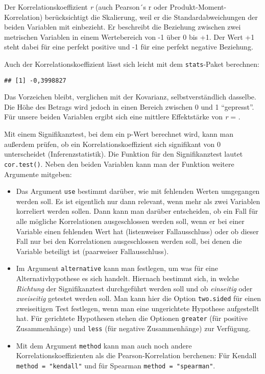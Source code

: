 \documentclass[
]{book}
\newenvironment{Shaded}{\begin{snugshade}}{\end{snugshade}}
\newcommand{\FunctionTok}[1]{\textcolor[rgb]{0.00,0.00,0.00}{#1}}
\newcommand{\NormalTok}[1]{#1}
\newcommand{\SpecialCharTok}[1]{\textcolor[rgb]{0.00,0.00,0.00}{#1}}
\begin{document}
Der Korrelationskoeffizient \emph{r} (auch Pearson´s r oder Produkt-Moment-Korrelation) berücksichtigt die Skalierung, weil er die Standardabweichungen der beiden Variablen mit einbezieht. Er beschreibt die Beziehung zwischen zwei metrischen Variablen in einem Wertebereich von -1 über 0 bis +1. Der Wert +1 steht dabei für eine perfekt positive und -1 für eine perfekt negative Beziehung.

Auch der Korrelationskoeffizient lässt sich leicht mit dem \texttt{stats}-Paket berechnen:

\begin{Shaded}
\end{Shaded}

\begin{verbatim}
## [1] -0,3998827
\end{verbatim}

Das Vorzeichen bleibt, verglichen mit der Kovarianz, selbstverständlich dasselbe. Die Höhe des Betrags wird jedoch in einen Bereich zwischen 0 und 1 ``gepresst''. Für unsere beiden Variablen ergibt sich eine mittlere Effektstärke von \emph{r} = .

Mit einem Signifikanztest, bei dem ein p-Wert berechnet wird, kann man außerdem prüfen, ob ein Korrelationskoeffizient sich signifikant von 0 unterscheidet (Inferenzstatistik). Die Funktion für den Signifikanztest lautet \texttt{cor.test()}. Neben den beiden Variablen kann man der Funktion weitere Argumente mitgeben:

\begin{itemize}
\item
  Das Argument \texttt{use} bestimmt darüber, wie mit fehlenden Werten umgegangen werden soll. Es ist eigentlich nur dann relevant, wenn mehr als zwei Variablen korreliert werden sollen. Dann kann man darüber entscheiden, ob ein Fall für alle mögliche Korrelationen ausgeschlossen werden soll, wenn er bei einer Variable einen fehlenden Wert hat (listenweiser Fallausschluss) oder ob dieser Fall nur bei den Korrelationen ausgeschlossen werden soll, bei denen die Variable beteiligt ist (paarweiser Fallausschluss).
\item
  Im Argument \texttt{alternative} kann man festlegen, um was für eine Alternativhypothese es sich handelt. Hiernach bestimmt sich, in welche \emph{Richtung} der Signifikanztest durchgeführt werden soll und ob \emph{einseitig} oder \emph{zweiseitig} getestet werden soll. Man kann hier die Option \texttt{two.sided} für einen zweiseitigen Test festlegen, wenn man eine ungerichtete Hypothese aufgestellt hat. Für gerichtete Hypothesen stehen die Optionen \texttt{greater} (für positive Zusammenhänge) und \texttt{less} (für negative Zusammenhänge) zur Verfügung.
\item
  Mit dem Argument \texttt{method} kann man auch noch andere Korrelationskoeffizienten als die Pearson-Korrelation berchenen: Für Kendall \texttt{method\ =\ "kendall"} und für Spearman \texttt{method\ =\ "spearman"}.
\end{itemize}
\end{document}
